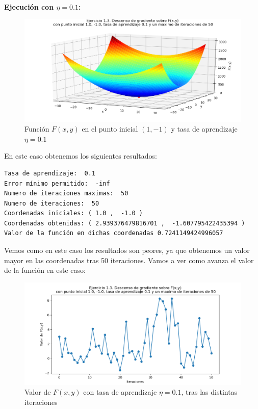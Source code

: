 \documentclass[12pt, spanish]{article}
\begin{document}
\textbf{Ejecución con $\eta = 0.1$:}


\begin{figure}[H]
  \centering
      \includegraphics[scale = 0.70]{ej1-3-1-1-10.png}
 		 \caption{Función $F(x,y)$ en el punto inicial $(1,-1)$ y tasa de aprendizaje $\eta = 0.1$}
  		\label{fig:ej1-3-1-1-10}

\end{figure}

En este caso obtenemos los siguientes resultados:
\begin{lstlisting}
Tasa de aprendizaje:  0.1
Error mínimo permitido:  -inf
Numero de iteraciones maximas:  50
Numero de iteraciones:  50
Coordenadas iniciales: ( 1.0 ,  -1.0 )
Coordenadas obtenidas: ( 2.939376479816701 ,  -1.607795422435394 )
Valor de la función en dichas coordenadas 0.7241149424996057
\end{lstlisting}

Vemos como en este caso los resultados son peores, ya que obtenemos un valor mayor en las coordenadas tras 50 iteraciones. Vamos a ver como avanza el valor de la función en este caso:


\begin{figure}[H]
  \centering
      \includegraphics[scale = 0.70]{ej1-3-1-1-10-ite.png}
 		 \caption{Valor de $F(x,y)$ con tasa de aprendizaje $\eta = 0.1$, tras las distintas iteraciones}
  		\label{fig:ej1-3-1-1-10-ite}

\end{figure}
\end{document}
